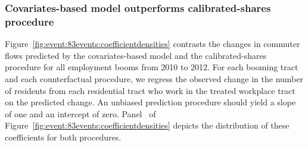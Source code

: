 \documentclass[11pt]{article}
\theoremstyle{definition}
\begin{document}
\subsubsection{Covariates-based model outperforms calibrated-shares procedure}

Figure~\ref{fig:event:83events:coefficientdensities} contrasts the
changes in commuter flows predicted by the covariates-based model and the calibrated-shares procedure
for all  employment booms from 2010 to 2012.
For each booming tract and each counterfactual procedure,
we regress the observed change in the number of residents from each residential tract who work in the treated workplace tract on the predicted change.
An unbiased prediction procedure should yield a slope of one and an intercept of zero.
Panel~ of Figure~\ref{fig:event:83events:coefficientdensities} depicts the distribution of these coefficients for both procedures.

\end{document}
